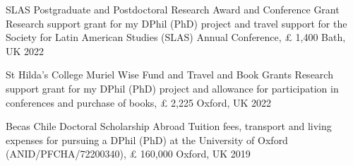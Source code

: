 





\vspace{1mm}

\begin{cvhonors}
\cvhonor
{SLAS Postgraduate and Postdoctoral Research Award and Conference Grant} 
{Research support grant for my DPhil (PhD) project and travel support for the Society for Latin American Studies (SLAS) Annual Conference, {\pounds} 1,400}
{Bath, UK}
{2022}
\end{cvhonors}

\vspace{1mm}

\begin{cvhonors}
\cvhonor
{St Hilda's College Muriel Wise Fund and Travel and Book Grants} 
{Research support grant for my DPhil (PhD) project and allowance for participation in conferences and purchase of books, {\pounds} 2,225} 
{Oxford, UK}
{2022}
\end{cvhonors}

\vspace{1mm}

\begin{cvhonors}
\cvhonor
{Becas Chile Doctoral Scholarship Abroad} 
{Tuition fees, transport and living expenses for pursuing a DPhil (PhD) at the University of Oxford (ANID/PFCHA/72200340), {\pounds} 160,000}
{Oxford, UK}
{2019}
\end{cvhonors}

\vspace{1mm}


